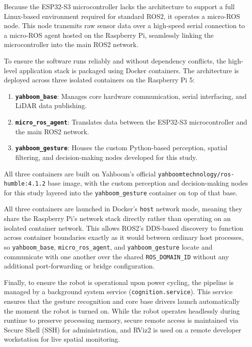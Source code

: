 Because the ESP32-S3 microcontroller lacks the architecture to support a full Linux-based environment required for standard ROS2, it operates a micro-ROS node. This node transmits raw sensor data over a high-speed serial connection to a micro-ROS agent hosted on the Raspberry Pi, seamlessly linking the microcontroller into the main ROS2 network.

To ensure the software runs reliably and without dependency conflicts, the high-level application stack is packaged using Docker containers. The architecture is deployed across three isolated containers on the Raspberry Pi 5:
\begin{enumerate}
    \item \textbf{\texttt{yahboom\_base}}: Manages core hardware communication, serial interfacing, and LiDAR data publishing.
    \item \textbf{\texttt{micro\_ros\_agent}}: Translates data between the ESP32-S3 microcontroller and the main ROS2 network.
    \item \textbf{\texttt{yahboom\_gesture}}: Houses the custom Python-based perception, spatial filtering, and decision-making nodes developed for this study.
\end{enumerate}

All three containers are built on Yahboom's official \texttt{yahboomtechnology/ros-humble:4.1.2} base image, with the custom perception and decision-making nodes for this study layered into the \texttt{yahboom\_gesture} container on top of that base.

All three containers are launched in Docker's \texttt{host} network mode, meaning they share the Raspberry Pi's network stack directly rather than operating on an isolated container network. This allows ROS2's DDS-based discovery to function across container boundaries exactly as it would between ordinary host processes, so \texttt{yahboom\_base}, \texttt{micro\_ros\_agent}, and \texttt{yahboom\_gesture} locate and communicate with one another over the shared \texttt{ROS\_DOMAIN\_ID} without any additional port-forwarding or bridge configuration.

Finally, to ensure the robot is operational upon power cycling, the pipeline is managed by a background system service (\texttt{cognition.service}). This service ensures that the gesture recognition and core base drivers launch automatically the moment the robot is turned on. While the robot operates headlessly during runtime to preserve processing memory, secure remote access is maintained via Secure Shell (SSH) for administration, and RViz2 is used on a remote developer workstation for live spatial monitoring. 

